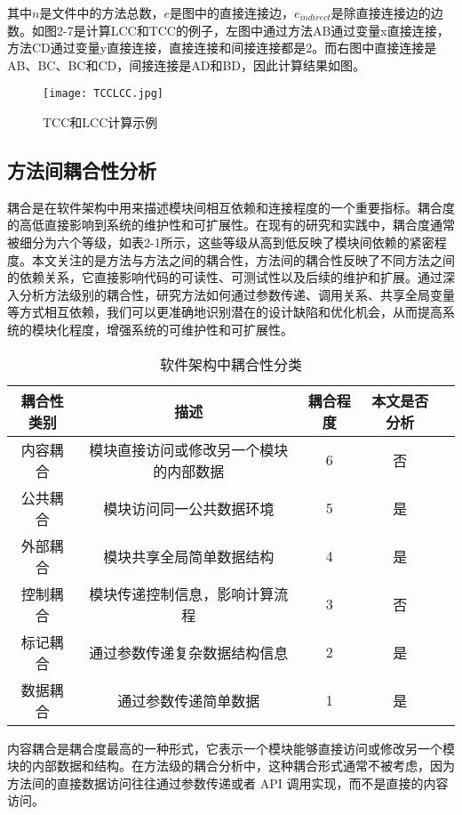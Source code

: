 其中\(n\)是文件中的方法总数，\(e\)是图中的直接连接边，\(e_{indirect}\)是除直接连接边的边数。如图2-7是计算LCC和TCC的例子，左图中通过方法AB通过变量x直接连接，方法CD通过变量y直接连接，直接连接和间接连接都是2。而右图中直接连接是AB、BC、BC和CD，间接连接是AD和BD，因此计算结果如图。

\begin{figure}[h]
\centering
\texttt{[image: TCCLCC.jpg]}
\caption{TCC和LCC计算示例}
\end{figure}


\subsection{方法间耦合性分析}

耦合是在软件架构中用来描述模块间相互依赖和连接程度的一个重要指标。耦合度的高低直接影响到系统的维护性和可扩展性。在现有的研究和实践中，耦合度通常被细分为六个等级，如表2-1所示，这些等级从高到低反映了模块间依赖的紧密程度。本文关注的是方法与方法之间的耦合性，方法间的耦合性反映了不同方法之间的依赖关系，它直接影响代码的可读性、可测试性以及后续的维护和扩展。通过深入分析方法级别的耦合性，研究方法如何通过参数传递、调用关系、共享全局变量等方式相互依赖，我们可以更准确地识别潜在的设计缺陷和优化机会，从而提高系统的模块化程度，增强系统的可维护性和可扩展性。

\begin{table}[htbp]
\caption{软件架构中耦合性分类}
\vspace{0.5em}\centering\wuhao
\begin{tabular}{ccccc}
\toprule
耦合性类别 & 描述 & 耦合程度 & 本文是否分析 \\
\midrule
内容耦合 & 模块直接访问或修改另一个模块的内部数据 & 6 & 否\\
公共耦合 & 模块访问同一公共数据环境 & 5 & 是 \\
外部耦合 & 模块共享全局简单数据结构 & 4 & 是 \\
控制耦合 & 模块传递控制信息，影响计算流程 & 3 & 否 \\
标记耦合 & 通过参数传递复杂数据结构信息 & 2 & 是 \\
数据耦合 & 通过参数传递简单数据 & 1 & 是 \\
\bottomrule
\end{tabular}
\end{table}


内容耦合是耦合度最高的一种形式，它表示一个模块能够直接访问或修改另一个模块的内部数据和结构。在方法级的耦合分析中，这种耦合形式通常不被考虑，因为方法间的直接数据访问往往通过参数传递或者 API 调用实现，而不是直接的内容访问。

